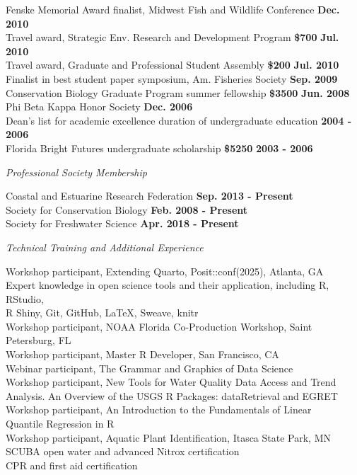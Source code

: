 \documentclass[letterpaper,12pt]{article}
\newcommand{\sectitle}[1]{\vspace{\baselineskip} \centerline{\large{\textit{#1}}}}
\begin{document}
Fenske Memorial Award finalist, Midwest Fish and Wildlife Conference \hfill {\bf Dec. 2010} \\
Travel award, Strategic Env. Research and Development Program {\bf \$700} \hfill {\bf Jul. 2010} \\
Travel award, Graduate and Professional Student Assembly {\bf \$200} \hfill {\bf Jul. 2010} \\
Finalist in best student paper symposium, Am. Fisheries Society \hfill {\bf Sep. 2009} \\
Conservation Biology Graduate Program summer fellowship {\bf \$3500} \hfill {\bf Jun. 2008} \\
Phi Beta Kappa Honor Society \hfill {\bf Dec. 2006} \\
Dean's list for academic excellence duration of undergraduate education \hfill {\bf 2004 - 2006} \\
Florida Bright Futures undergraduate scholarship {\bf \$5250} \hfill {\bf 2003 - 2006} 

\sectitle{Professional Society Membership}

Coastal and Estuarine Research Federation \hfill {\bf Sep. 2013 - Present} \\
Society for Conservation Biology \hfill {\bf Feb. 2008 - Present} \\
Society for Freshwater Science \hfill {\bf Apr. 2018 - Present}

\sectitle{Technical Training and Additional Experience}

Workshop participant, Extending Quarto, Posit::conf(2025), Atlanta, GA \\
Expert knowledge in open science tools and their application, including R, RStudio, \\
\hspace{0.3in}R Shiny, Git, GitHub, \LaTeX, Sweave, knitr \\
Workshop participant, NOAA Florida Co-Production Workshop, Saint Petersburg, FL \\
Workshop participant, Master R Developer, San Francisco, CA \\
Webinar participant, The Grammar and Graphics of Data Science \\
Workshop participant, New Tools for Water Quality Data Access and Trend \\ \hspace{0.3in} Analysis. An Overview of the USGS R Packages: dataRetrieval and EGRET\\
Workshop participant, An Introduction to the Fundamentals of Linear \\
\hspace{0.3in}Quantile Regression in R \\
Workshop participant, Aquatic Plant Identification, Itasca State Park, MN \\
SCUBA open water and advanced Nitrox certification \\
CPR and first aid certification
\end{document}
